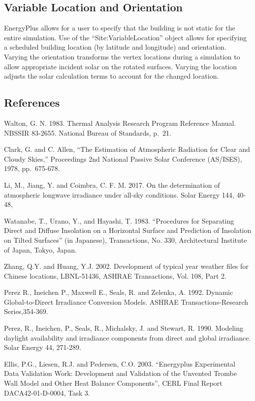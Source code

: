 \subsection{Variable Location and Orientation}\label{variable-location-orientation}

EnergyPlus allows for a user to specify that the building is not static for the entire simulation.
Use of the ``Site:VariableLocation'' object allows for specifying a scheduled building location (by latitude and longitude) and orientation.
Varying the orientation transforms the vertex locations during a simulation to allow appropriate incident solar on the rotated surfaces.
Varying the location adjusts the solar calculation terms to account for the changed location.

\subsection{References}\label{references-010}

Walton, G. N. 1983. Thermal Analysis Research Program Reference Manual. NBSSIR 83-2655. National Bureau of Standards, p.~21.

Clark, G. and C. Allen, ``The Estimation of Atmospheric Radiation for Clear and Cloudy Skies,'' Proceedings 2nd National Passive Solar Conference (AS/ISES), 1978, pp.~675-678.

Li, M., Jiang, Y. and Coimbra, C. F. M. 2017. On the determination of atmospheric longwave irradiance under all-sky conditions. Solar Energy 144,  40-48,

Watanabe, T., Urano, Y., and Hayashi, T. 1983. ``Procedures for Separating Direct and Diffuse Insolation on a Horizontal Surface and Prediction of Insolation on Tilted Surfaces'' (in Japanese), Transactions, No. 330, Architectural Institute of Japan, Tokyo, Japan.

Zhang, Q.Y. and Huang, Y.J. 2002. Development of typical year weather files for Chinese locations, LBNL-51436, ASHRAE Transactions, Vol. 108, Part 2.

Perez R., Ineichen P., Maxwell E., Seals, R. and Zelenka, A. 1992. Dynamic Global-to-Direct Irradiance Conversion Models. ASHRAE Transactions-Research Series,354-369.

Perez, R., Ineichen, P., Seals, R., Michalsky, J. and Stewart, R. 1990. Modeling daylight availability and irradiance components from direct and global irradiance. Solar Energy 44, 271-289.

Ellis, P.G., Liesen, R.J. and Pedersen, C.O. 2003. ``Energyplus Experimental Data Validation Work: Development and Validation of the Unvented Trombe Wall Model and Other Heat Balance Components'', CERL Final Report DACA42-01-D-0004, Task 3.

